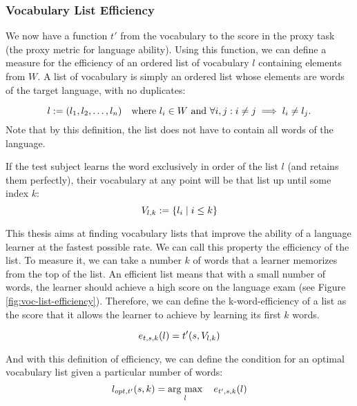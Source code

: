 \subsubsection{Vocabulary List Efficiency}
We now have a function $t'$ from the vocabulary to the score in the proxy task (the proxy metric for language ability).
Using this function, we can define a measure for the efficiency of an ordered list of vocabulary $l$ containing elements from $W$.
A list of vocabulary is simply an ordered list whose elements are words of the target language, with no duplicates:

\begin{equation*}
	l        := (l_1, l_2, \dots, l_n) \quad \text{where } l_i \in W \text{ and } \forall i,j: i \neq j \implies l_i \neq l_j . \\
\end{equation*}
Note that by this definition, the list does not have to contain all words of the language.

If the test subject learns the word exclusively in order of the list $l$ (and retains them perfectly), their vocabulary at any point will be that list up until some index $k$:
\begin{equation*}
	V_{l, k} := \{l_i \mid i \leq k\}                                                                                 \\
\end{equation*}


This thesis aims at finding vocabulary lists that improve the ability of a language learner at the fastest possible rate.
We can call this property the efficiency of the list.
To measure it, we can take a number $k$ of words that a learner memorizes from the top of the list.
An efficient list means that with a small number of words, the learner should achieve a high score on the language exam (see Figure \ref{fig:voc-list-efficiency}).
Therefore, we can define the k-word-efficiency of a list as the score that it allows the learner to achieve by learning its first $k$ words.

\begin{equation}
	e_{t, s, k}(l) =  t'(s,  V_{l, k})\\
\end{equation}

And with this definition of efficiency, we can define the condition for an optimal vocabulary list given a particular number of words:
\begin{equation} \label{eq:optimal-vocab-list}
	l_{opt, t'} (s, k) = \mathop{\rm arg~max}\limits_{l} \quad e_{t', s, k}(l)
\end{equation}

